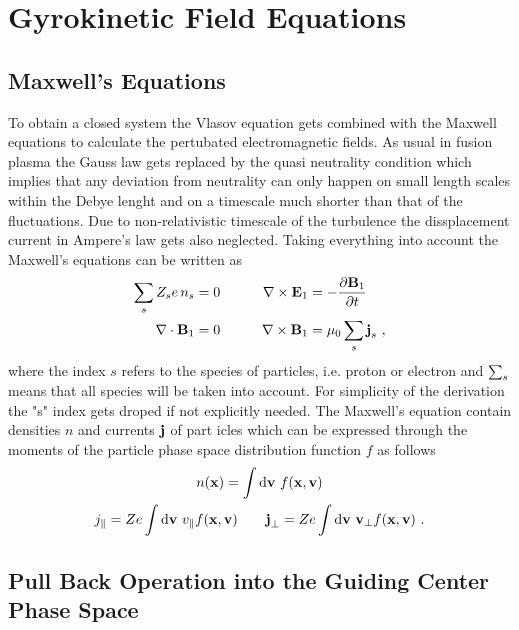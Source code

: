 \newpage
\section{Gyrokinetic Field Equations}
\label{sec:fields}

\subsection{Maxwell's Equations}
\label{sub:maxwellEquations}

To obtain a closed system the Vlasov equation gets combined with the Maxwell equations to calculate the pertubated electromagnetic fields. As usual in fusion plasma the Gauss law gets replaced by the quasi neutrality condition which implies that any deviation from neutrality can only happen on small length scales within the Debye lenght and on a timescale much shorter than that of the fluctuations. Due to non-relativistic timescale of the turbulence the dissplacement current in Ampere's law gets also neglected. Taking everything into account the Maxwell's equations can be written as
\begin{gather}
	\begin{aligned}
		\sum_s Z_s e \, n_s &= 0  &\qquad \nabla \times \boldsymbol{\mathbf{E}}_1 &= - \frac{\partial \boldsymbol{\mathbf{B}}_1}{\partial t}\\
		\nabla \cdot \boldsymbol{\mathbf{B}}_1 &= 0 &\qquad \nabla \times \boldsymbol{\mathbf{B}}_1 &= \mu_0 \sum_s \boldsymbol{\mathbf{j}}_s~,
	\end{aligned}
	\label{eq:maxwellEquations}
\end{gather}
where the index $s$ refers to the species of particles, i.e. proton or electron and $\sum_s$ means that all species will be taken into account. For simplicity of the derivation the "s" index gets droped if not explicitly needed. The Maxwell's equation contain densities $n$ and currents $\boldsymbol{\mathbf{j}}$ of part icles which can be expressed through the moments of the particle phase space distribution function $f$ as follows
\begin{gather}
	n(\boldsymbol{\mathbf{x}}) = \int \mathrm{d}\boldsymbol{\mathbf{v}} ~ f(\boldsymbol{\mathbf{x}}, \boldsymbol{\mathbf{v}}) \\
	j_\parallel = Ze \int \mathrm{d}\boldsymbol{\mathbf{v}} ~ v_\parallel f(\boldsymbol{\mathbf{x}}, \boldsymbol{\mathbf{v}}) \qquad \boldsymbol{\mathbf{j}}_\perp = Ze \int \mathrm{d}\boldsymbol{\mathbf{v}} ~ \boldsymbol{\mathbf{v}}_\perp f(\boldsymbol{\mathbf{x}}, \boldsymbol{\mathbf{v}})~.
	\label{eq:momentsParticleSpace}
\end{gather}
\newpage

\subsection{Pull Back Operation into the Guiding Center Phase Space}
\label{sub:pullback}

